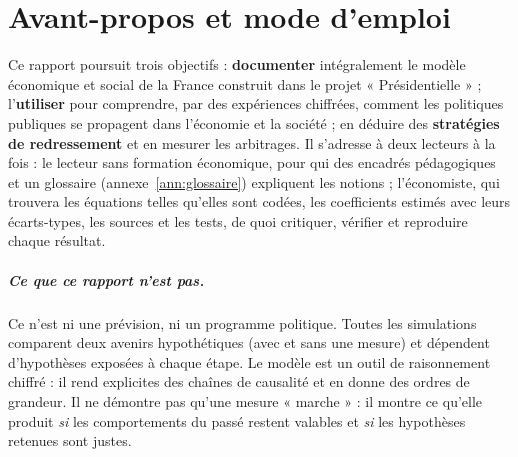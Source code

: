 \chapter*{Avant-propos et mode d'emploi}

Ce rapport poursuit trois objectifs : \textbf{documenter} intégralement le modèle économique et social de la France
construit dans le projet « Présidentielle » ; l'\textbf{utiliser} pour comprendre, par des expériences chiffrées, comment
les politiques publiques se propagent dans l'économie et la société ; en déduire des \textbf{stratégies de redressement}
et en mesurer les arbitrages. Il s'adresse à deux lecteurs à la fois : le lecteur sans formation économique, pour qui
des encadrés pédagogiques et un glossaire (annexe~\ref{ann:glossaire}) expliquent les notions ; l'économiste, qui
trouvera les équations telles qu'elles sont codées, les coefficients estimés avec leurs écarts-types, les sources et
les tests, de quoi critiquer, vérifier et reproduire chaque résultat.

\paragraph{Ce que ce rapport n'est pas.} Ce n'est ni une prévision, ni un programme politique. Toutes les simulations
comparent deux avenirs hypothétiques (avec et sans une mesure) et dépendent d'hypothèses exposées à chaque étape. Le
modèle est un outil de raisonnement chiffré : il rend explicites des chaînes de causalité et en donne des ordres de
grandeur. Il ne démontre pas qu'une mesure « marche » : il montre ce qu'elle produit \emph{si} les comportements du passé
restent valables et \emph{si} les hypothèses retenues sont justes.

